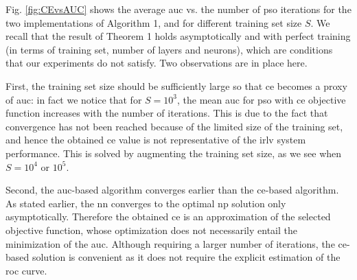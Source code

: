 \documentclass[conference,final]{IEEEtran}
\begin{document}
Fig. \ref{fig:CEvsAUC} shows the average \ac{auc}  vs. the number of \ac{pso} iterations for the two implementations of Algorithm 1, and for different training set size $S$.
We recall that the result of Theorem 1 holds asymptotically and with perfect training (in terms of training set, number of layers and neurons), which are conditions that our experiments do not satisfy. Two observations are in place here. 

First, the training set size should be sufficiently large so that \ac{ce} becomes a proxy of \ac{auc}: in fact we notice that for $S=10^3$, the  mean \ac{auc}  for \ac{pso} with \ac{ce} objective function increases with the  number of iterations. This is due to the fact that convergence has not been reached because of the limited size of the training set, and hence the obtained \ac{ce} value is not representative of the \ac{irlv} system performance. This is solved by augmenting the training set size, as we see when  $S=10^4$ or $10^5$. 

Second,  the \ac{auc}-based algorithm converges earlier than the \ac{ce}-based algorithm. As stated earlier, the \ac{nn} converges to the optimal \ac{np} solution only asymptotically. Therefore the obtained \ac{ce} is an approximation of the selected objective function, whose optimization does not necessarily entail the minimization of the \ac{auc}. Although requiring a larger number of iterations, the \ac{ce}-based solution is convenient as it does not require the explicit estimation of the \ac{roc} curve.   

\end{document}
